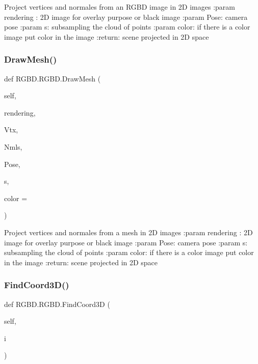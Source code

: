 \begin{DoxyVerb}Project vertices and normales from an RGBD image in 2D images
:param rendering : 2D image for overlay purpose or black image
:param Pose: camera pose
:param s: subsampling the cloud of points
:param color: if there is a color image put color in the image
:return: scene projected in 2D space
\end{DoxyVerb}
 \mbox{\label{class_r_g_b_d_1_1_r_g_b_d_a64b91c854c9de20090ad961f201fe026}} 
\subsubsection{\texorpdfstring{Draw\+Mesh()}{DrawMesh()}}
{\footnotesize\ttfamily def R\+G\+B\+D.\+R\+G\+B\+D.\+Draw\+Mesh (\begin{DoxyParamCaption}\item[{}]{self,  }\item[{}]{rendering,  }\item[{}]{Vtx,  }\item[{}]{Nmls,  }\item[{}]{Pose,  }\item[{}]{s,  }\item[{}]{color = {} }\end{DoxyParamCaption})}

\begin{DoxyVerb}Project vertices and normales from a mesh in 2D images
:param rendering : 2D image for overlay purpose or black image
:param Pose: camera pose
:param s: subsampling the cloud of points
:param color: if there is a color image put color in the image
:return: scene projected in 2D space
\end{DoxyVerb}
 \mbox{\label{class_r_g_b_d_1_1_r_g_b_d_a345e2077de5144592ad36c57885ba836}} 
\subsubsection{\texorpdfstring{Find\+Coord3\+D()}{FindCoord3D()}}
{\footnotesize\ttfamily def R\+G\+B\+D.\+R\+G\+B\+D.\+Find\+Coord3D (\begin{DoxyParamCaption}\item[{}]{self,  }\item[{}]{i }\end{DoxyParamCaption})}


